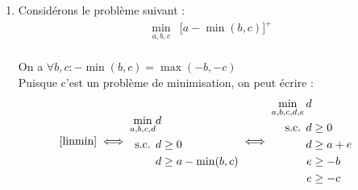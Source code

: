 \documentclass[a4paper,12pt]{article}
\begin{document}
\begin {enumerate}
{\begin{equation}
\begin{aligned}
            \text{ s.c. } & A(\alpha, \beta, \gamma)^T \leq b \\
        \end{aligned}
    \end{equation}
    On introduit la variable continue $\delta$ et les contraintes suivantes :
    $$ \delta \geq \alpha $$
    $$ \delta \geq \beta $$
    Le problème initial s'écrit alors :
    \begin{equation}
        \begin{aligned}
            \min _{\alpha, \beta, \gamma, \delta}  \delta &+ \gamma \\
            \text{ s.c. }  A(\alpha, \beta, \gamma)^T &\leq b \\
            \alpha &\leq \delta \\
            \beta &\leq \delta \\
        \end{aligned}
    \end{equation}
}

\item{
    Considérons le problème suivant :
    \begin{equation}
        \begin{aligned}
            \min _{a, b, c} & \lbrack a - \min(b, c) \rbrack^+ \\
        \end{aligned}
        \label{linmin}
    \end{equation}

    On a $ \forall b, c : -\min(b, c) = \max(-b, -c) $ \\
    Puisque c'est un problème de minimisation, on peut écrire :
    \begin{equation}
        \eqref{linmin} \iff
        \begin{aligned}
            \min _{a, b, c, d} & d \\
            \text{ s.c. } & d \geq 0 \\
            & d \geq a - \min(b, c) \\
        \end{aligned}
        \iff
        \begin{aligned}
            \min _{a, b, c, d, e} d \\
            \text{ s.c. }
            d &\geq 0 \\
            d &\geq a + e \\
            e &\geq -b \\
            e &\geq -c \\   
        \end{aligned}
    \end{equation}
}



\end{enumerate}
\end{document}
